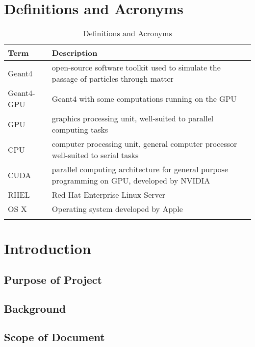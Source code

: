 \documentclass[12pt]{article}
\begin{document}
\section{Definitions and Acronyms} %
\begin{table}[h]
\centering
\caption{Definitions and Acronyms}
\begin{tabularx}{\textwidth}{l|X}
\Xhline{2\arrayrulewidth}
\bf Term & \bf Description\\
\hline
Geant4 & open-source software toolkit used to simulate the passage of particles through matter\\\hline
Geant4-GPU & Geant4 with some computations running on the GPU\\\hline
GPU & graphics processing unit, well-suited to parallel computing tasks\\\hline
CPU & computer processing unit, general computer processor well-suited to serial tasks\\\hline
CUDA & parallel computing architecture for general purpose programming on GPU, developed by NVIDIA\\\hline
RHEL & Red Hat Enterprise Linux Server\\\hline
OS X & Operating system developed by Apple\\
\Xhline{2\arrayrulewidth}
\end{tabularx}
\end{table}



\section{Introduction} %
\subsection{Purpose of Project} %
\subsection{Background} %
\subsection{Scope of Document} %
\end{document}
